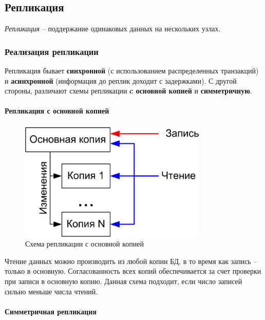 \subsection{Репликация}

\begin{definition}
	\textit{Репликация} -- поддержание одинаковых данных на нескольких узлах.
\end{definition}

\subsubsection{Реализация репликации}

Репликация бывает \textbf{синхронной} (с использованием распределенных транзакций) и \textbf{асинхронной} (информация до реплик доходит с задержками). С другой стороны, различают
схемы репликации \textbf{c основной копией} и \textbf{симметричную}.

\paragraph{Репликация с основной копией}

\begin{figure}[h]
	\centering
	\includegraphics[width=0.8\textwidth]{../assets/kgeorgiy/distributed/Replication_Master.png}
	\caption{Схема репликации с основной копией}
	\label{repl-master}
\end{figure}

Чтение данных можно производить из любой копии БД, в то время как запись -- только в основную.
Согласованность всех копий обеспечивается за счет проверки при записи в основную копию. Данная
схема подходит, если число записей сильно меньше числа чтений.

\paragraph{Симметричная репликация}

